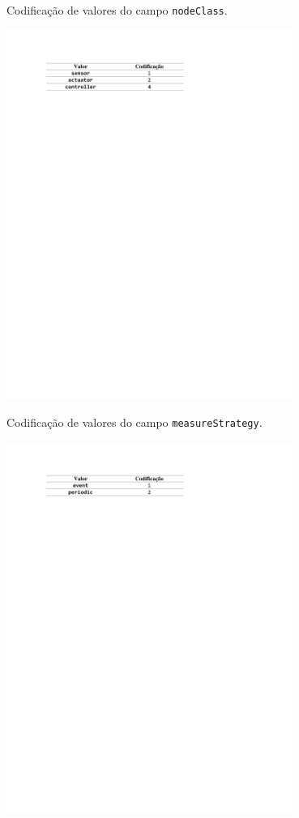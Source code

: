 \begin{table}[hp]	
	\centering
	\caption{Codificação de valores do campo \texttt{nodeClass}.}\smallskip
	\label{tab:cod_valores_nodeclass}
	\includegraphics[width=0.7\textwidth]{tabelas/cod_valores_nodeclass.pdf}
\end{table}

\begin{table}[hp]	
	\centering
	\caption{Codificação de valores do campo \texttt{measureStrategy}.}\smallskip
	\label{tab:cod_valores_measurestrat}
	\includegraphics[width=0.7\textwidth]{tabelas/cod_valores_measurestrat.pdf}
\end{table}

